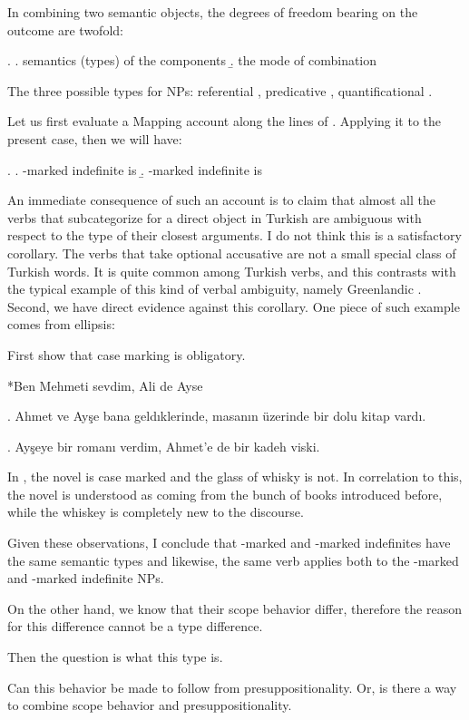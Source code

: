 \documentclass[11pt,a4paper]{article}
\begin{document}
In combining two semantic objects, the degrees of freedom bearing on the outcome are twofold:

\ex.
\a. semantics (types) of  the components
\b. the mode of combination



The three possible types for NPs: referential , predicative , quantificational . 

Let us first evaluate a Mapping account along the lines of . Applying it to the present case, then we will have:

\ex.
\a. \acc-marked indefinite is 
\b. \zero-marked indefinite is 


An immediate consequence of such an account is to claim that almost all the verbs that subcategorize for a direct object in Turkish are ambiguous with respect to the type of their closest arguments. I do not think this is a satisfactory corollary. The verbs that take optional accusative are not a small special class of Turkish words. It is quite common among Turkish verbs, and this contrasts with the typical example of this kind of verbal ambiguity, namely Greenlandic . Second, we have direct evidence against this corollary. One piece of such example comes from ellipsis:

First show that case marking is obligatory.

*Ben Mehmeti sevdim, Ali de Ayse


\ex. Ahmet ve Ayşe bana geldıklerinde, masanın üzerinde bir dolu kitap vardı.


\ex.\label{typeell} Ayşeye bir romanı verdim, Ahmet'e de bir kadeh viski.


In , the novel is case marked and the glass of whisky is not. In correlation to this, the novel is understood as coming from the bunch of books introduced before, while the whiskey is completely new to the discourse. 

Given these observations, I conclude that \acc-marked and \zero-marked indefinites have the same semantic types and likewise, the same verb applies both to the \acc-marked and \zero-marked indefinite NPs.

On the other hand, we know that their scope behavior differ, therefore the reason for this difference cannot be a type difference.    


Then the question is what this type is.


\begin{uquestion}
Can this behavior be made to follow from presuppositionality. Or, is there a way to combine scope behavior and presuppositionality.
\end{uquestion}
\end{document}
